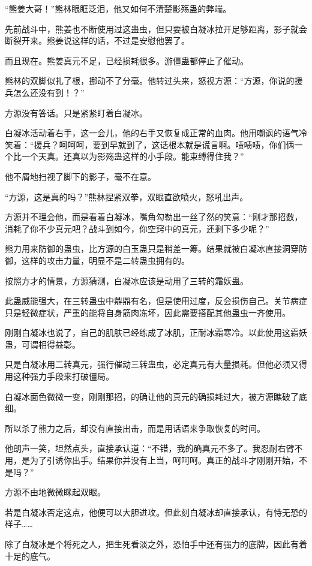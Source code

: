 \begin{this_body}
“熊姜大哥！”熊林眼眶泛泪，他又如何不清楚影殇蛊的弊端。

先前战斗中，熊姜也不断使用过这蛊虫，但只要被白凝冰拉开足够距离，影子就会断裂开来。熊姜说这样的话，不过是安慰他罢了。

而且现在。熊姜真元不足，已经损耗很多。游僵蛊都停止了催动。

熊林的双脚似扎了根，挪动不了分毫。他转过头来，怒视方源：“方源，你说的援兵怎么还没有到！？”

方源没有答话。只是紧紧盯着白凝冰。

白凝冰活动着右手，这一会儿，他的右手又恢复成正常的血肉。他用嘲讽的语气冷笑着：“援兵？呵呵呵，要到早就到了，这话根本就是谎言啊。啧啧啧，你们俩一个比一个天真。还真以为影殇蛊这样的小手段。能束缚得住我？”

他不屑地扫视了脚下的影子，毫不在意。

“方源，这是真的吗？”熊林捏紧双拳，双眼直欲喷火，怒吼出声。

方源并不理会他，而是看着白凝冰，嘴角勾勒出一丝了然的笑意：“刚才那招数，消耗了你不少真元吧？战斗到如今，你空窍中的真元，还剩下多少呢？”

熊力用来防御的蛊虫，比方源的白玉蛊只是稍差一筹。结果就被白凝冰直接洞穿防御，这样的攻击力量，明显不是二转蛊虫拥有的。

按照方才的情景，方源猜测，白凝冰应该是动用了三转的霜妖蛊。

此蛊威能强大，在三转蛊虫中鼎鼎有名，但是使用过度，反会损伤自己。关节病症只是轻微症状，严重的能将自身筋肉冻坏，因此需要搭配其他蛊虫一齐使用。

刚刚白凝冰也说了，自己的肌肤已经练成了冰肌，正耐冰霜寒冷。以此使用这霜妖蛊，可谓相得益彰。

只是白凝冰用二转真元，强行催动三转蛊虫，必定真元有大量损耗。但他必须又得用这种强力手段来打破僵局。

白凝冰面色微微一变，刚刚那招，的确让他的真元的确损耗过大，被方源瞧破了底细。

所以杀了熊力之后，却没有直接出击，而是用话语来争取恢复的时间。

他朗声一笑，坦然点头，直接承认道：“不错，我的确真元不多了。我忍耐右臂不用，是为了引诱你出手。结果你并没有上当，呵呵呵。真正的战斗才刚刚开始，不是吗？”

方源不由地微微眯起双眼。

若是白凝冰否定这点，他便可以大胆进攻。但此刻白凝冰却直接承认，有恃无恐的样子……

除了白凝冰是个将死之人，把生死看淡之外，恐怕手中还有强力的底牌，因此有着十足的底气。


\end{this_body}
